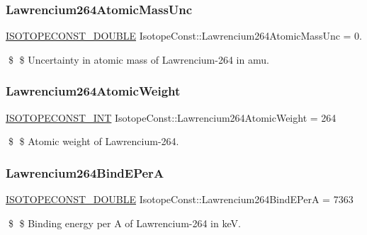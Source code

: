 \subsubsection{\texorpdfstring{Lawrencium264\+Atomic\+Mass\+Unc}{Lawrencium264AtomicMassUnc}}
{\footnotesize\ttfamily \mbox{\hyperlink{group___isotope_const-_macros_ga8f45a7272ce02c0b4c65c44636ed719a}{I\+S\+O\+T\+O\+P\+E\+C\+O\+N\+S\+T\+\_\+\+D\+O\+U\+B\+LE}} Isotope\+Const\+::\+Lawrencium264\+Atomic\+Mass\+Unc = 0.}

\$ \$ Uncertainty in atomic mass of Lawrencium-\/264 in amu. \mbox{\label{group___isotope_const-_lawrencium-_lr264_gacdbd7c54b98ea7c0be717031abecde0b}} 
\subsubsection{\texorpdfstring{Lawrencium264\+Atomic\+Weight}{Lawrencium264AtomicWeight}}
{\footnotesize\ttfamily \mbox{\hyperlink{group___isotope_const-_macros_ga5f18360b3e99483a35c32d789e62621c}{I\+S\+O\+T\+O\+P\+E\+C\+O\+N\+S\+T\+\_\+\+I\+NT}} Isotope\+Const\+::\+Lawrencium264\+Atomic\+Weight = 264}

\$ \$ Atomic weight of Lawrencium-\/264. \mbox{\label{group___isotope_const-_lawrencium-_lr264_gab7877892c9944cd08f1da3cc416924de}} 
\subsubsection{\texorpdfstring{Lawrencium264\+Bind\+E\+PerA}{Lawrencium264BindEPerA}}
{\footnotesize\ttfamily \mbox{\hyperlink{group___isotope_const-_macros_ga8f45a7272ce02c0b4c65c44636ed719a}{I\+S\+O\+T\+O\+P\+E\+C\+O\+N\+S\+T\+\_\+\+D\+O\+U\+B\+LE}} Isotope\+Const\+::\+Lawrencium264\+Bind\+E\+PerA = 7363}

\$ \$ Binding energy per A of Lawrencium-\/264 in keV. \mbox{\label{group___isotope_const-_lawrencium-_lr264_ga79ce0ac17b880e82c2754aba0af1d52e}} 
